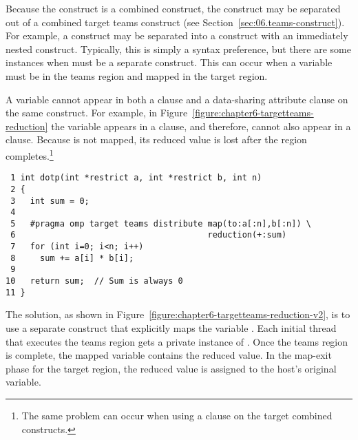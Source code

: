 Because the  construct is a combined construct, 
the  construct may be separated out of 
a combined target teams construct (see Section~\ref{sec:06.teams-construct}).
For example, a  construct may be separated into a
 construct with an immediately nested  construct.  Typically, this is simply a syntax preference, but
there are some instances when  must be a separate construct.
This can occur when a variable must be  in the teams region and
mapped in the target region.  

A variable cannot appear in both a  clause and a data-sharing
attribute clause on the same
construct.  For example, in Figure~\ref{figure:chapter6-targetteams-reduction}
the variable  appears in a  clause, and therefore, cannot also
appear in a  clause.  Because  is not mapped, its reduced value is 
lost after the  region completes.\footnote{The same problem
can occur when using a  clause on the target combined constructs.}

\begin{figure*}[!tbh]
\begin{verbatim}
 1 int dotp(int *restrict a, int *restrict b, int n)
 2 {
 3   int sum = 0;
 4 
 5   #pragma omp target teams distribute map(to:a[:n],b[:n]) \
 6                                       reduction(+:sum)
 7   for (int i=0; i<n; i++)
 8     sum += a[i] * b[i];
 9 
10   return sum;  // Sum is always 0
11 }
\end{verbatim}
\caption{ \textbf {A variable cannot appear in both map and reduction clauses on the same construct} -- \small
          The \texttt{reduction} clause is associated with the
          \texttt{teams} directive.
          The variable \texttt{sum} is not mapped, and therefore,
          the reduced value of \texttt{sum} is lost after the region.
        }
\label{figure:chapter6-targetteams-reduction}
\end{figure*}

The solution, as shown in
Figure~\ref{figure:chapter6-targetteams-reduction-v2}, is to use a separate
\code{target} construct that explicitly maps the variable .  Each initial
thread that executes the teams region gets a private instance of .  Once
the teams region is complete, the mapped \code{sum} variable contains the reduced
value.  In the map-exit phase for the target region, the reduced value
is assigned to the host's original \code{sum} variable. 

